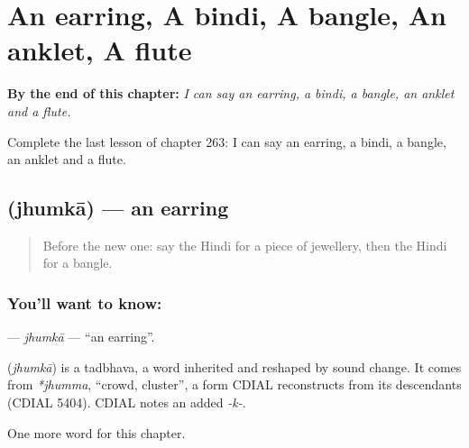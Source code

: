 
\chapter{An earring, A bindi, A bangle, An anklet, A flute}
\label{ch:hi-an-earring-a-bindi-a-bangle-an-anklet-a-flute}

\begin{chapteropening}
\textbf{By the end of this chapter:} \emph{I can say an earring, a bindi, a bangle, an anklet and a flute.}

Complete the last lesson of chapter 263: I can say an earring, a bindi, a bangle, an anklet and a flute.
\end{chapteropening}

\section[\texorpdfstring{\hi{झुमका} (jhumkā)}{झुमका (jhumkā)}]{ (jhumkā) — an earring}

\label{lesson:HI-C263-jhumka}



\begin{quote}
Before the new one: say the Hindi for a piece of jewellery, then the Hindi for a bangle.
\end{quote}

\subsection*{You'll want to know: }
\textbf{} — \emph{jhumkā} — \textquotedblleft{}an earring\textquotedblright{}.

\begin{cousinweb}
\textbf{} (\emph{jhumkā}) is a tadbhava, a word inherited and reshaped by sound change. It comes from \emph{*jhumma}, \textquotedblleft{}crowd, cluster\textquotedblright{}, a form CDIAL reconstructs from its descendants (CDIAL 5404). CDIAL notes an added \emph{-k-}.
\end{cousinweb}

\begin{grammarlens}[title={What you've built}]
One more word for this chapter.
\end{grammarlens}

